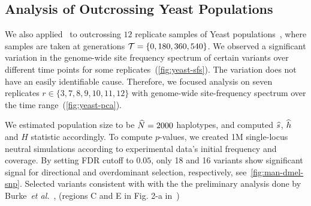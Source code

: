 
\subsection{Analysis of Outcrossing Yeast Populations}
We also applied \comale\ to outcrossing $12$ replicate samples of
Yeast populations~\cite{burke2014standing}, where samples are taken at
generations ${\cal T}=\{0,180,360,540\}$. We observed a significant
variation in the genome-wide site frequency spectrum of certain
variants over different time points for some
replicates~(\ref{fig:yeast-sfs}). The variation does not have an
easily identifiable cause. Therefore, we focused analysis on seven
replicates $r\in\{3,7,8,9,10,11,12\}$ with genome-wide site-frequency
spectrum over the time range~(\ref{fig:yeast-pca}).

We estimated population size to be $\widehat{N}=2000$ haplotypes, and computed
$\widehat{s}$, $\widehat{h}$ and $H$ statistic accordingly. To compute $p$-values, we
created 1M single-locus neutral simulations according to experimental
data's initial frequency and coverage. By setting FDR cutoff to
$0.05$, only 18 and 16 variants show significant signal for
directional and overdominant selection, respectively,
see~\ref{fig:man-dmel-snp}.
Selected variants consistent with with the the preliminary analysis done by 
Burke~\emph{et al.}~\cite{burke2014standing}, (regions C and E in Fig. 2-a 
in~\cite{burke2014standing})
